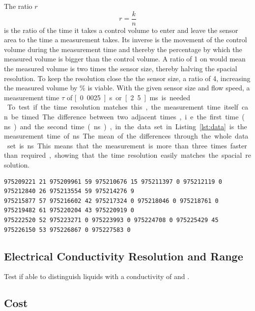 The ratio $ r $
\begin{equation}
	r = \frac{k}{n}
\label{eq:resr} 
\end{equation}
is the ratio of the time it takes a control volume to enter and leave the sensor area  to the time a measurement takes. Its inverse is the movement of the control volume during the measurement time and thereby the percentage by which the measured volume is bigger than the control volume. A ratio of 1 on would mean the measured volume is two times the sensor size, thereby halving the spacial resolution. To keep the resolution close the the sensor size, a ratio of 4, increasing the measured volume by \unit[25]{\%} is viable.
With the given sensor size and flow speed, a measurement time $ \tau $ of \unit[0.0025]{s} or \unit[2.5]{ms} is needed.\\

To test if the time resolution matches this, the measurement time itself can be timed. The difference between two adjacent times, i.e. the first time (\unit[975209221]{ns}) and the second time (\unit[975209961]{ns}), in the data set in Listing \ref{lst:data} is the measurement time of \unit[740]{ns}. The mean of the differences through the whole data set is \unit[748]{ns}. This means that the measurement is more than three times faster than required, showing that the time resolution easily matches the spacial resolution.

\begin{lstlisting}[caption={An excerpt of measurement data showing three lines of data from 8 sensors. The long numbers are the times at which the measurements were taken in nanoseconds measurement from the start, the short numbers are the measured values.},label={lst:data}]
975209221 21 975209961 59 975210676 15 975211397 0 975212119 0 975212840 26 975213554 59 975214276 9 
975215877 57 975216602 42 975217324 0 975218046 0 975218761 0 975219482 61 975220204 43 975220919 0 
975222520 52 975223271 0 975223993 0 975224708 0 975225429 45 975226150 53 975226867 0 975227583 0  
\end{lstlisting}

\subsection{Electrical Conductivity Resolution and Range}

Test if able to distinguish liquids with a conductivity of  and .

\subsection{Cost}

